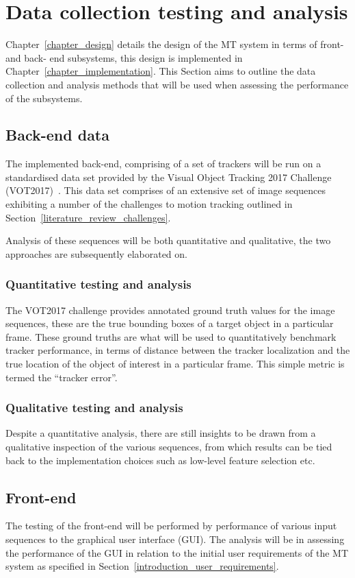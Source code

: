 \section{Data collection testing and analysis}\label{methodology_testing}
Chapter~\ref{chapter_design} details the design of the MT system in terms of
front- and back- end subsystems, this design is implemented in
Chapter~\ref{chapter_implementation}. This Section aims to outline the data
collection and analysis methods that will be used when assessing the
performance of the subsystems.

\subsection{Back-end data}
The implemented back-end, comprising of a set of trackers will be run on a
standardised data set provided by the Visual Object Tracking 2017 Challenge
(VOT2017)~\cite{VOT2017}. This data set comprises of an extensive set of image
sequences exhibiting a number of the challenges to motion tracking outlined in
Section~\ref{literature_review_challenges}. 

Analysis of these sequences will be both quantitative and qualitative, the two
approaches are subsequently elaborated on.

\subsubsection{Quantitative testing and analysis}
The VOT2017 challenge provides annotated ground truth values for the image
sequences, these are the true bounding boxes of a target object in a particular
frame. These ground truths are what will be used to quantitatively benchmark
tracker performance, in terms of distance between the tracker localization and
the true location of the object of interest in a particular frame. This simple
metric is termed the ``tracker error''.

\subsubsection{Qualitative testing and analysis}
Despite a quantitative analysis, there are still insights to be drawn from a
qualitative inspection of the various sequences, from which results can be tied
back to the implementation choices such as low-level feature selection etc.

\subsection{Front-end}
The testing of the front-end will be performed by performance of various input
sequences to the graphical user interface (GUI). The analysis will be in assessing the
performance of the GUI in relation to the initial user requirements of the MT
system as specified in Section~\ref{introduction_user_requirements}.







